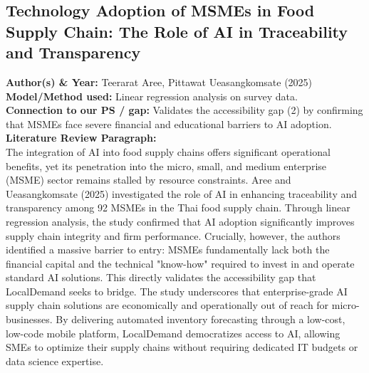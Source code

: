 \documentclass[conference]{IEEEtran}
\begin{document}
\subsection{Technology Adoption of MSMEs in Food Supply Chain: The Role of AI in Traceability and Transparency}
\textbf{Author(s) \& Year:} Teerarat Aree, Pittawat Ueasangkomsate (2025)\\
\textbf{Model/Method used:} Linear regression analysis on survey data.\\
\textbf{Connection to our PS / gap:} Validates the accessibility gap (2) by confirming that MSMEs face severe financial and educational barriers to AI adoption.\\
\textbf{Literature Review Paragraph:}\\
The integration of AI into food supply chains offers significant operational benefits, yet its penetration into the micro, small, and medium enterprise (MSME) sector remains stalled by resource constraints. Aree and Ueasangkomsate (2025) investigated the role of AI in enhancing traceability and transparency among 92 MSMEs in the Thai food supply chain. Through linear regression analysis, the study confirmed that AI adoption significantly improves supply chain integrity and firm performance. Crucially, however, the authors identified a massive barrier to entry: MSMEs fundamentally lack both the financial capital and the technical "know-how" required to invest in and operate standard AI solutions. This directly validates the accessibility gap that LocalDemand seeks to bridge. The study underscores that enterprise-grade AI supply chain solutions are economically and operationally out of reach for micro-businesses. By delivering automated inventory forecasting through a low-cost, low-code mobile platform, LocalDemand democratizes access to AI, allowing SMEs to optimize their supply chains without requiring dedicated IT budgets or data science expertise.
\end{document}
